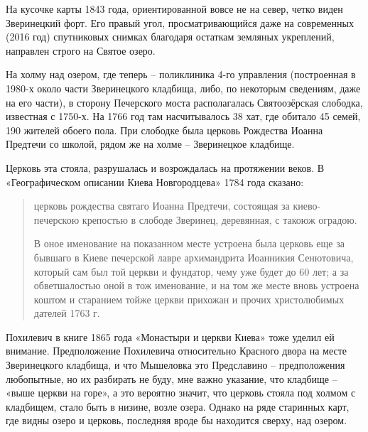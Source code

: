 На кусочке карты 1843 года, ориентированной вовсе не на север, четко виден Зверинецкий форт. Его правый угол, просматривающийся даже на современных (2016 год) спутниковых снимках благодаря остаткам земляных укреплений, направлен строго на Святое озеро.

На холму над озером, где теперь – поликлиника 4-го управления (построенная в 1980-х около части Зверинецкого кладбища, либо, по некоторым сведениям, даже на его части), в сторону Печерского моста располагалась Святоозёрская слободка, известная с 1750-х. На 1766 год там насчитывалось 38 хат, где обитало 45 семей, 190 жителей обоего пола. При слободке была церковь Рождества Иоанна Предтечи со школой, рядом же на холме – Зверинецкое кладбище.

Церковь эта стояла, разрушалась и возрождалась на протяжении веков. В «Географическом описании Киева Новгородцева» 1784 года\cite{sbornikmat} сказано:

\begin{quotation}
церковь рождества святаго Иоанна Предтечи, состоящая за киево-печерскою крепостью в слободе Зверинец, деревянная, с такоюж оградою.

В оное именование на показанном месте устроена была церковь еще за бывшаго в Киеве печерской лавре архимандрита Иоанникия Сенютовича, который сам был той церкви и фундатор, чему уже будет до 60 лет; а за обветшалостью оной в тож именование, и на том же месте вновь устроена коштом и старанием тойже церкви прихожан и прочих христолюбимых дателей 1763 г.
\end{quotation}

Похилевич в книге 1865 года «Монастыри и церкви Киева» тоже уделил ей внимание. Предположение Похилевича относительно Красного двора на месте Зверинецкого кладбища, и что Мышеловка это Предславино – предположения любопытные, но их разбирать не буду, мне важно указание, что кладбище – «выше церкви на горе», а это вероятно значит, что церковь стояла под холмом с кладбищем, стало быть в низине, возле озера. Однако на ряде старинных карт, где видны озеро и церковь, последняя вроде бы находится сверху, над озером.

